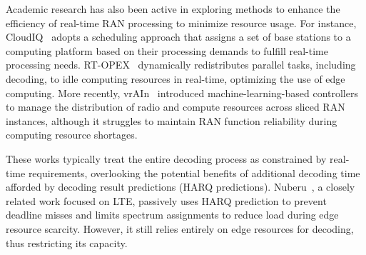 Academic research has also been active in exploring methods to enhance the efficiency of real-time RAN processing to minimize resource usage. For instance, CloudIQ~\cite{CloudIQ} adopts a scheduling approach that assigns a set of base stations to a computing platform based on their processing demands to fulfill real-time processing needs. RT-OPEX~\cite{RT-OPEX} dynamically redistributes parallel tasks, including decoding, to idle computing resources in real-time, optimizing the use of edge computing. More recently, vrAIn~\cite{vrAIn} introduced machine-learning-based controllers to manage the distribution of radio and compute resources across sliced RAN instances, although it struggles to maintain RAN function reliability during computing resource shortages.
\iffalse
These works typically treat the entirety of the decoding process as constrained by real-time requirements and do not leverage the potential benefits of additional decoding time afforded by decoding result predictions (or HARQ predictions). In this context, Nuberu~\cite{Nuberu} emerged as a work closely related to \Name{}, albeit focusing on LTE. Nuberu passively employs HARQ prediction to prevent deadline misses in LTE, further limiting spectrum assignments as a form of computing congestion control to reduce load during edge resource scarcity. However, its approach still depends entirely on edge resources for decoding processes, thus limiting its capacity for decoding. As comparison in table~\ref{tab:related}, \Name{} introduces an innovative decoding scheduling framework that actively utilizes HARQ prediction, pre-parsing for packet subheaders and intelligently manages resource allocation between edge and remote servers, enhancing overall system efficiency and capability. 
\fi 

These works typically treat the entire decoding process as constrained by real-time requirements, overlooking the potential benefits of additional decoding time afforded by decoding result predictions (HARQ predictions). Nuberu~\cite{Nuberu}, a closely related work focused on LTE, passively uses HARQ prediction to prevent deadline misses and limits spectrum assignments to reduce load during edge resource scarcity. However, it still relies entirely on edge resources for decoding, thus restricting its capacity.
